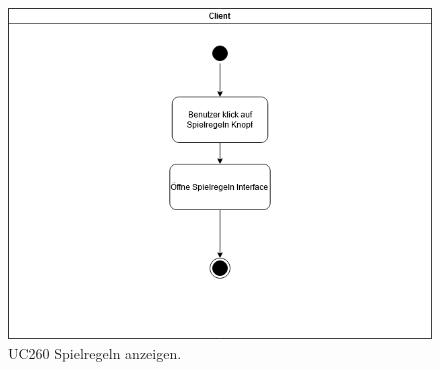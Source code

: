 \begin{figure}[h]
	\centering
	\includegraphics[width=\textwidth]{ad/UC260_Spielregeln.png}
	\caption{UC260 Spielregeln anzeigen.}
\end{figure}
